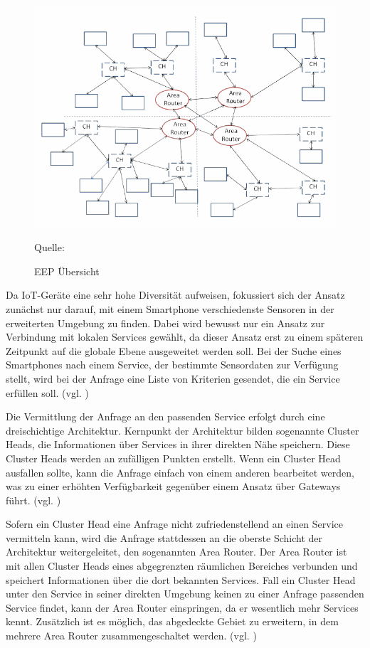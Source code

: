 \documentclass[conference,compsoc]{IEEEtran}
\begin{document}
\begin{figure}
\centering
\includegraphics[scale=0.45]{EEP.png}
\caption{EEP Übersicht}
\label{EEPBild}
Quelle: \cite{energy-efficient}
\end{figure}

Da IoT-Geräte eine sehr hohe Diversität aufweisen, fokussiert sich der Ansatz zunächst nur darauf, mit einem Smartphone verschiedenste Sensoren in der erweiterten Umgebung zu finden. Dabei wird bewusst nur ein Ansatz zur Verbindung mit lokalen Services gewählt, da dieser Ansatz erst zu einem späteren Zeitpunkt auf die globale Ebene ausgeweitet werden soll. Bei der Suche eines Smartphones nach einem Service, der bestimmte Sensordaten zur Verfügung stellt, wird bei der Anfrage eine Liste von Kriterien gesendet, die ein Service erfüllen soll. (vgl. \cite{energy-efficient})

Die Vermittlung der Anfrage an den passenden Service erfolgt durch eine dreischichtige Architektur. Kernpunkt der Architektur bilden sogenannte Cluster Heads, die Informationen über Services in ihrer direkten Nähe speichern. Diese Cluster Heads werden an zufälligen Punkten erstellt. Wenn ein Cluster Head ausfallen sollte, kann die Anfrage einfach von einem anderen bearbeitet werden, was zu einer erhöhten Verfügbarkeit gegenüber einem Ansatz über Gateways führt. (vgl. \cite{energy-efficient})

Sofern ein Cluster Head eine Anfrage nicht zufriedenstellend an einen Service vermitteln kann, wird die Anfrage stattdessen an die oberste Schicht der Architektur weitergeleitet, den sogenannten Area Router. Der Area Router ist mit allen Cluster Heads eines abgegrenzten räumlichen Bereiches verbunden und speichert Informationen über die dort bekannten Services. Fall ein Cluster Head unter den Service in seiner direkten Umgebung keinen zu einer Anfrage passenden Service findet, kann der Area Router einspringen, da er wesentlich mehr Services kennt. Zusätzlich ist es möglich, das abgedeckte Gebiet zu erweitern, in dem mehrere Area Router zusammengeschaltet werden. (vgl. \cite{energy-efficient})
\end{document}

